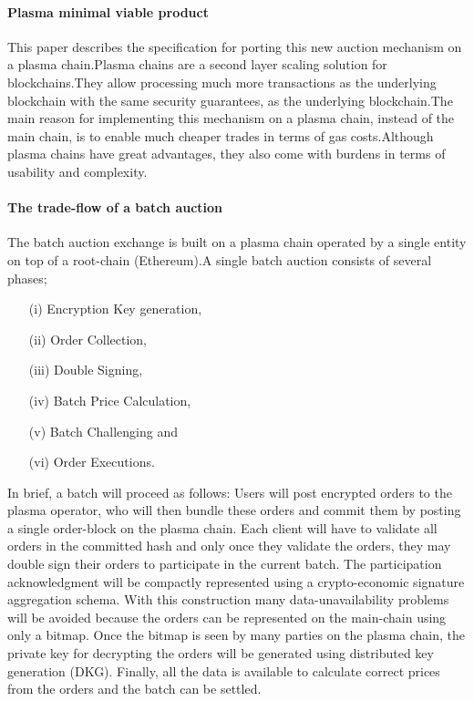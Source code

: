 \documentclass[11pt,parskip=full]{scrartcl}%
\begin{document}
\paragraph{Plasma minimal viable product}

This paper describes the specification for porting this new auction mechanism on a plasma chain.Plasma chains are a second layer scaling solution for blockchains.They allow processing much more transactions as the underlying blockchain with the same security guarantees, as the underlying blockchain.The main reason for implementing this mechanism on a plasma chain, instead of the main chain, is to enable much cheaper trades in terms of gas costs.Although plasma chains have great advantages, they also come with burdens in terms of usability and complexity.

\paragraph{The trade-flow of a batch auction}  

The batch auction exchange is built on a plasma chain operated by a single entity on top of a root-chain (Ethereum).A single batch auction consists of several phases;
\begin{itemize}
\item[(i)] Encryption Key generation,
\item[(ii)] Order Collection,
\item[(iii)] Double Signing,
\item[(iv)] Batch Price Calculation,
\item[(v)] Batch Challenging and
\item[(vi)] Order Executions.
\end{itemize}
In brief, a batch will proceed as follows: Users will post encrypted orders to the plasma operator, who will then bundle these orders and commit them by posting a single order-block on the plasma chain.
Each client will have to validate all orders in the committed hash and only once they validate the orders, they may double sign their orders to participate in the current batch.
The participation acknowledgment will be compactly represented using a crypto-economic signature aggregation schema.
With this construction many data-unavailability problems will be avoided because the orders can be represented on the main-chain using only a bitmap.
Once the bitmap is seen by many parties on the plasma chain, the private key for decrypting the orders will be generated using distributed key generation (DKG).
Finally, all the data is available to calculate correct prices from the orders and the batch can be settled.
\end{document}
